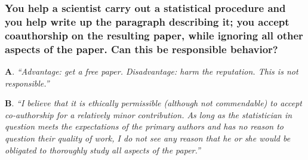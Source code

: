 \documentclass[12pt]{beamer}
\newcommand\ans[1]{{\it ``#1''}}
\newcommand\gap{\vspace{5mm}}
\begin{document}
\begin{frame} %
\frametitle{You help a scientist carry out a statistical procedure and you help write up the paragraph describing it; you accept coauthorship on the resulting paper, while ignoring all other aspects of the paper. Can this be responsible behavior?
}


{\bf A}. \ans{Advantage:  get a free paper.  Disadvantage:  harm the reputation.  This is not responsible.}

\gap

{\bf B}. \ans{I  believe  that  it  is  ethically  permissible  (although  not  commendable)  to  accept  co-authorship for a relatively minor contribution.  As long as the statistician in question meets  the  expectations  of  the  primary  authors  and  has  no  reason  to  question  their quality of work, I do not see any reason that he or she would be obligated to thoroughly study all aspects of the paper.}

\end{frame}
\end{document}
